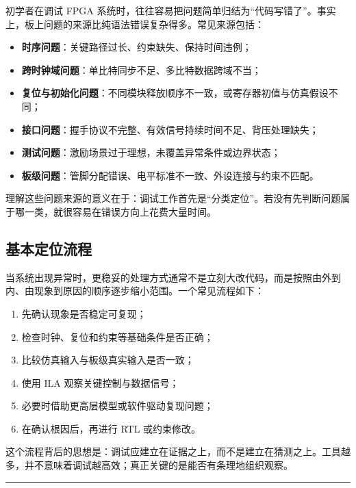 初学者在调试 FPGA
系统时，往往容易把问题简单归结为``代码写错了''。事实上，板上问题的来源比纯语法错误复杂得多。常见来源包括：

\begin{itemize}
\tightlist
\item
  \textbf{时序问题}：关键路径过长、约束缺失、保持时间违例；
\item
  \textbf{跨时钟域问题}：单比特同步不足、多比特数据跨域不当；
\item
  \textbf{复位与初始化问题}：不同模块释放顺序不一致，或寄存器初值与仿真假设不同；
\item
  \textbf{接口问题}：握手协议不完整、有效信号持续时间不足、背压处理缺失；
\item
  \textbf{测试问题}：激励场景过于理想，未覆盖异常条件或边界状态；
\item
  \textbf{板级问题}：管脚分配错误、电平标准不一致、外设连接与约束不匹配。
\end{itemize}

理解这些问题来源的意义在于：调试工作首先是``分类定位''。若没有先判断问题属于哪一类，就很容易在错误方向上花费大量时间。

\subsection{基本定位流程}\label{ux57faux672cux5b9aux4f4dux6d41ux7a0b}

当系统出现异常时，更稳妥的处理方式通常不是立刻大改代码，而是按照由外到内、由现象到原因的顺序逐步缩小范围。一个常见流程如下：

\begin{enumerate}
\def\labelenumi{\arabic{enumi}.}
\tightlist
\item
  先确认现象是否稳定可复现；
\item
  检查时钟、复位和约束等基础条件是否正确；
\item
  比较仿真输入与板级真实输入是否一致；
\item
  使用 ILA 观察关键控制与数据信号；
\item
  必要时借助更高层模型或软件驱动复现问题；
\item
  在确认根因后，再进行 RTL 或约束修改。
\end{enumerate}

这个流程背后的思想是：调试应建立在证据之上，而不是建立在猜测之上。工具越多，并不意味着调试越高效；真正关键的是能否有条理地组织观察。

\begin{center}\rule{0.5\linewidth}{0.5pt}\end{center}

